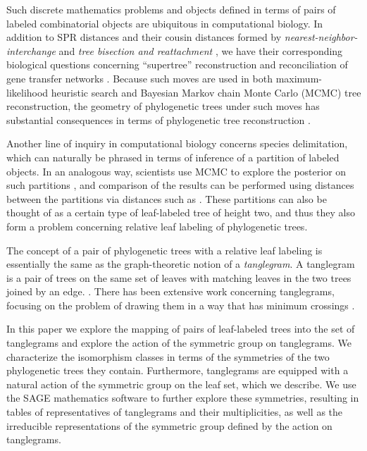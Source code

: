 \documentclass{amsart}
\begin{document}
Such discrete mathematics problems and objects defined in terms of pairs of labeled combinatorial objects are ubiquitous in computational biology.
In addition to SPR distances and their cousin distances formed by \emph{nearest-neighbor-interchange} and \emph{tree bisection and reattachment} \cite{wiki:treeRearrangement}, we have their corresponding biological questions concerning ``supertree'' reconstruction \cite{Whidden2014-ku} and reconciliation of gene transfer networks \cite{Boon2013-mc}.
Because such moves are used in both maximum-likelihood heuristic search and Bayesian Markov chain Monte Carlo (MCMC) tree reconstruction, the geometry of phylogenetic trees under such moves has substantial consequences in terms of phylogenetic tree reconstruction \cite{Whidden2014-yt}.

Another line of inquiry in computational biology concerns species delimitation, which can naturally be phrased in terms of inference of a partition of labeled objects.
In an analogous way, scientists use MCMC to explore the posterior on such partitions \cite{Yang2010-kc}, and comparison of the results can be performed using distances between the partitions via distances such as \cite{Gusfield2002-il}.
These partitions can also be thought of as a certain type of leaf-labeled tree of height two, and thus they also form a problem concerning relative leaf labeling of phylogenetic trees.

The concept of a pair of phylogenetic trees with a relative leaf labeling is essentially the same as the graph-theoretic notion of a \emph{tanglegram}.
A tanglegram is a pair of trees on the same set of leaves with matching leaves in the two trees joined by an edge. \cite{Venkatachalam2010-zh}.
There has been extensive work concerning tanglegrams, focusing on the problem of drawing them in a way that has minimum crossings \cite{Buchin2008-lc,Lozano2008-tp,Bansal2009-ni,Bocker2009-xl,Fernau2010-an,Venkatachalam2010-zh}.

In this paper we explore the mapping of pairs of leaf-labeled trees into the set of tanglegrams and explore the action of the symmetric group on tanglegrams.
We characterize the isomorphism classes in terms of the symmetries of the two phylogenetic trees they contain.
Furthermore, tanglegrams are equipped with a natural action of the symmetric group on the leaf set, which we describe.
We use the SAGE mathematics software \cite{SteinJoyner2005} to further explore these symmetries, resulting in tables of representatives of tanglegrams and their multiplicities, as well as the irreducible representations of the symmetric group defined by the action on tanglegrams.
\end{document}
